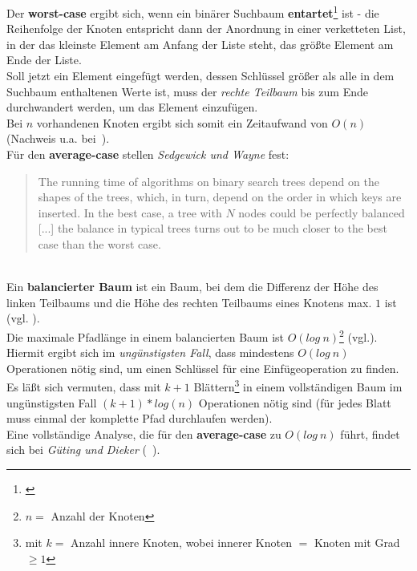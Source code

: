  \noindent
Der \textbf{worst-case} ergibt sich, wenn ein binärer Suchbaum \textbf{entartet}\footnote{
\cite[136]{GD18e}
} ist - die Reihenfolge der Knoten entspricht dann der Anordnung in einer verketteten List, in der das kleinste Element am Anfang der Liste steht, das größte Element am Ende der Liste.\\
Soll jetzt ein Element eingefügt werden, dessen Schlüssel größer als alle in dem Suchbaum enthaltenen Werte ist, muss der \textit{rechte Teilbaum} bis zum Ende durchwandert werden, um das Element einzufügen.\\
Bei $n$ vorhandenen Knoten ergibt sich somit ein Zeitaufwand von $O(n)$ (Nachweis u.a. bei~\cite[135 f.]{GD18d}).\\

\noindent
Für den \textbf{average-case} stellen \textit{Sedgewick und Wayne} fest:

\blockquote[{\cite[403]{SW11}}]{
The running time of algorithms on binary search trees depend on the shapes of the trees, which, in turn, depend on the order in which keys are inserted. In the best case, a tree with $N$ nodes could be perfectly balanced [...] the balance in typical trees turns out to be much closer to the best case than the worst case.
}\\

\noindent
Ein \textbf{balancierter Baum} ist ein Baum, bei dem die Differenz der Höhe des linken Teilbaums und die Höhe des rechten Teilbaums eines Knotens max. $1$ ist (vgl. \cite[284]{OW17e}).\\
Die maximale Pfadlänge in einem balancierten Baum ist $O(log\ n)$\footnote{$n=$ Anzahl der Knoten} (vgl.\cite[135]{GD18d}).\\
Hiermit ergibt sich im \textit{ungünstigsten Fall}, dass mindestens $O(log\ n)$ Operationen nötig sind, um einen Schlüssel für eine Einfügeoperation zu finden.\\
Es läßt sich vermuten, dass mit ${k+1}$ Blättern\footnote{mit $k=$ Anzahl innere Knoten, wobei innerer Knoten $=$ Knoten mit Grad $\geq 1$} in einem vollständigen Baum im ungünstigsten Fall $(k+1) * log(n)$ Operationen nötig sind (für jedes Blatt muss einmal der komplette Pfad durchlaufen werden).\\
Eine vollständige Analyse, die für den \textbf{average-case} zu $O(log\ n)$ führt, findet sich bei \textit{Güting und Dieker} (~\cite[136 ff.]{GD18d}).























